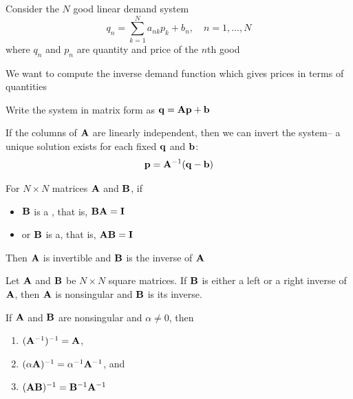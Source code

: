 \begin{frame}
    
    \vspace{2em}
    \Eg
    Consider the $N$ good linear demand system
    \begin{equation*}
        q_n = \sum_{k=1}^N a_{nk} p_k + b_n,
        \quad n = 1, \ldots, N
    \end{equation*}
    where $q_n$ and $p_n$ are quantity and price of the $n$th good
    
    \vspace{.7em}
    We want to compute the inverse demand function which gives prices in terms of quantities
    
    \vspace{.7em}
    Write the system
    in matrix form as ${\mathbf q} = \mathbf A {\mathbf p} + {\mathbf b}$
    
    If the columns of $\mathbf A$ are linearly independent, then 
    we can invert the system-- a unique solution
    exists for each fixed ${\mathbf q}$ and ${\mathbf b}$:
    \[{\mathbf p} = \mathbf A^{-1} ({\mathbf q} - {\mathbf b})\]
    
\end{frame}

\begin{frame}

    \vspace{.7em}    
    For $N\times N$ matrices $\mathbf A$ and $\mathbf B$, if
    
    \begin{itemize}
        \item $\mathbf B$ is a
        , that is, $\mathbf B \mathbf A = \mathbf I$ 
        \item  or $\mathbf B$ is a, that is, $\mathbf A \mathbf B = \mathbf I$ 
    \end{itemize}

    \vspace{.7em}    
    Then $\mathbf A$ is invertible and $\mathbf B$ is the inverse of $\mathbf A$
    
    \vspace{.7em}
    \Fact{\eqref{ET-fa:lrinv}}
    Let $\mathbf A$ and $\mathbf B$ be $N \times N$ square matrices.
    If $\mathbf B$ is either a left or a right inverse of $\mathbf A$,
    then $\mathbf A$ is nonsingular and $\mathbf B$ is its inverse.
 

\end{frame}

\begin{frame}

    \vspace{.7em}
    \Fact{\eqref{ET-fa:bpiv}}
    If $\mathbf A$ and $\mathbf B$ are nonsingular and $\alpha \not= 0$, then
    \begin{enumerate}
        \item $(\mathbf A^{-1})^{-1} = \mathbf A$,
        \item $(\alpha \mathbf A)^{-1} = \alpha^{-1} \mathbf A^{-1}$, and 
        \item $(\mathbf A \mathbf B)^{-1} = \mathbf B^{-1} \mathbf A^{-1}$
    \end{enumerate}
    
\end{frame}

